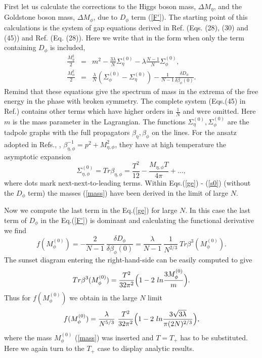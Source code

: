 \documentclass[a4paper,12pt]{article}
\begin{document}
First let us calculate the corrections to the Higgs boson mass,
$\Delta M_{\eta}$, and the Goldstone boson mass, $\Delta M_{\phi}$,
due to $D_{\phi}$ term (\ref{F'}). The starting point of this
calculations is the system of gap equations derived in Ref.\cite{prd}
(Eqs. (28), (30) and (45)) and Ref. \cite{pl} (Eq. (28)).  Here we
write that in the form when only the term containing $D_{\phi}$ is
included,
\begin{eqnarray} \label{ge}
\frac{M^2_{\eta}}{2} &=&  m^2 - \frac{3 \lambda}{N} \Sigma^{(0)}_{\eta} 
- \lambda \frac{N - 1}{N}  \Sigma^{(0)}_{\phi},\\ \nonumber
\frac{M^2_{\phi}}{2} &=& \frac{ \lambda}{N} (\Sigma^{(0)}_{\phi} -
\Sigma^{(0)}_{\eta} ) - \frac{1}{N - 1} \frac{\delta D_{\phi}}{\delta 
\beta_{\phi}(0)}.
\end{eqnarray}
Remind that these equations give the spectrum of mass in the extrema
 of the free energy in the phase with broken symmetry. The complete
 system (Eqs.(45) in Ref.\cite{prd}) contains other terms which have
 higher orders in $\frac{1}{N}$ and were omitted. Here $m$ is the mass
 parameter in the Lagrangian. The functions $\Sigma^{(0)}_{\eta},
 \Sigma^{(0)}_{\phi}$ are the tadpole graphs with the full propagators
 $\beta_{\eta}, \beta_{\phi}$ on the lines. For the ansatz adopted in
 Refs.\cite{prd}, \cite{pl}, $\beta^{-1}_{\eta,\phi} = p^2 +
 M^2_{\eta,\phi}$, they have at high temperature the asymptotic
 expansion
\begin{equation} \label{s0}
\Sigma^{(0)}_{\eta, \phi} = Tr \beta_{\eta,\phi} = \frac{T^2}{12} -
\frac{M_{\eta,\phi} T}{4 \pi} + ... ,
\end{equation}
where dots mark next-next-to-leading terms. Within Eqs.(\ref{ge}) -
(\ref{s0}) (without the $D_{\phi}$ term) the masses (\ref{mass}) have
been derived in the limit of large $N$.

Now we compute the last term in the Eq.(\ref{ge}) for large $N$. In
this case the last term of $D_{\phi}$ in the Eq.(\ref{F'}) is dominant
and calculating the functional derivative we find
\begin{equation} \label{der}
f(M^{(0)}_{\phi}) = - \frac{2}{N - 1}~ \frac{\delta D_{\phi}}{\delta 
\beta_{\phi}(0)} = \frac{\lambda}{N - 1}~ \frac{1}{N^{2/3}}~ Tr \beta^3
(M^{(0)}_{\phi}).
\end{equation}
The sunset diagram entering the right-hand-side can be easily computed
to give \cite{prd}
\begin{equation} \label{der1}
 Tr \beta^3 (M^{(0)}_{\phi}) = \frac{T^2}{32 \pi^2}\Bigl ( 1 - 2~ ln
 \frac{3 M^{(0)}_{\phi}}{m}\Bigr) .
\end{equation}
Thus for $f(M^{(0)}_{\phi})$ we obtain in the large $N$ limit
\begin{equation} \label{f}
 f(M^{(0)}_{\phi})  = \frac{\lambda}{N^{5/3}}~ \frac{T^2}{32
 \pi^2}\Bigl ( 1 - 2~ ln \frac{3 \sqrt{3\lambda} }{\pi (2N)^{2/3}}\Bigr),
\end{equation}
where the mass $M^{(0)}_{\phi}$ (\ref{mass}) was inserted and $T =
T_+$ has to be substituted. Here we again turn to the $T_+$ case to
display analytic results.
\end{document}
